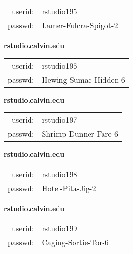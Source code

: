 \documentclass{article}\usepackage[]{graphicx}\usepackage[]{color}
\begin{document}
\begin{multicols}{3}
\begin{minipage}{.3\textwidth}
\begin{tabular}{rl}
userid: & rstudio195\\
passwd: & Lamer-Fulcra-Spigot-2

\vspace{5mm}

\end{tabular}\end{minipage}

\vspace{5mm}

\begin{minipage}{.3\textwidth}
\centerline{\textbf{rstudio.calvin.edu}}
\medskip
\begin{tabular}{rl}

userid: & rstudio196\\
passwd: & Hewing-Sumac-Hidden-6

\vspace{5mm}

\end{tabular}\end{minipage}

\vspace{5mm}

\begin{minipage}{.3\textwidth}
\centerline{\textbf{rstudio.calvin.edu}}
\medskip
\begin{tabular}{rl}

userid: & rstudio197\\
passwd: & Shrimp-Dunner-Fare-6

\vspace{5mm}

\end{tabular}\end{minipage}

\vspace{5mm}

\begin{minipage}{.3\textwidth}
\centerline{\textbf{rstudio.calvin.edu}}
\medskip
\begin{tabular}{rl}

userid: & rstudio198\\
passwd: & Hotel-Pita-Jig-2

\vspace{5mm}

\end{tabular}\end{minipage}

\vspace{5mm}

\begin{minipage}{.3\textwidth}
\centerline{\textbf{rstudio.calvin.edu}}
\medskip
\begin{tabular}{rl}

userid: & rstudio199\\
passwd: & Caging-Sortie-Tor-6

\vspace{5mm}

\end{tabular}\end{minipage}
\end{multicols}
\end{document}
